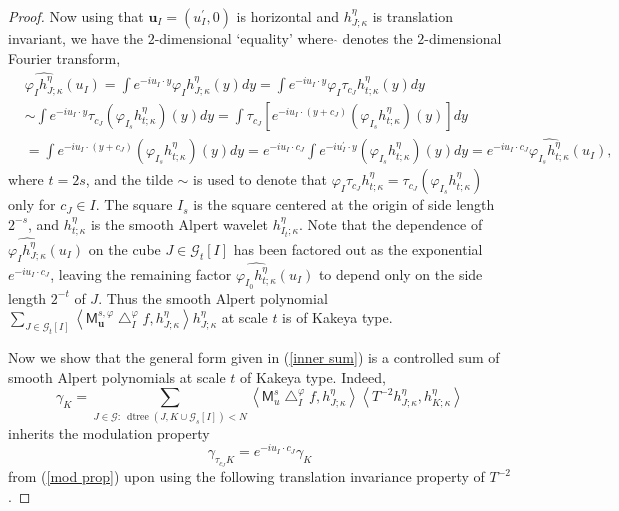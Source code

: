 \documentclass{amsart}%
\theoremstyle{plain}
\numberwithin{equation}{section}
\begin{document}
\begin{proof}
Now using that $\mathbf{u}_{I}=\left(  u_{I}^{\prime},0\right)  $ is
horizontal and $h_{J;\kappa}^{\eta}$ is translation invariant, we have the
$2$-dimensional `equality' where $\widehat{}$ denotes the $2$-dimensional
Fourier transform,%
\begin{align}
& \widehat{\varphi_{I}h_{J;\kappa}^{\eta}}\left(  u_{I}\right)  =\int
e^{-iu_{I}\cdot y}\varphi_{I}h_{J;\kappa}^{\eta}\left(  y\right)  dy=\int
e^{-iu_{I}\cdot y}\varphi_{I}\tau_{c_{J}}h_{t;\kappa}^{\eta}\left(  y\right)
dy\label{mod prop}\\
& \sim\int e^{-iu_{I}\cdot y}\tau_{c_{J}}\left(  \varphi_{I_{s}}h_{t;\kappa
}^{\eta}\right)  \left(  y\right)  dy=\int\tau_{c_{J}} \left[  e^{-iu_{I}%
\cdot\left(  y+c_{J}\right)  }\left(  \varphi_{I_{s}}h_{t;\kappa}^{\eta
}\right)  \left(  y\right)  \right]  dy\nonumber\\
& =\int e^{-iu_{I}\cdot\left(  y+c_{J}\right)  }\left(  \varphi_{I_{s}%
}h_{t;\kappa}^{\eta}\right)  \left(  y\right)  dy=e^{-iu_{I}\cdot c_{J}}\int
e^{-iu_{I}^{\prime}\cdot y}\left(  \varphi_{I_{s}}h_{t;\kappa}^{\eta}\right)
\left(  y\right)  dy=e^{-iu_{I}\cdot c_{J}}\widehat{\varphi_{I_{s}}%
h_{t;\kappa}^{\eta}}\left(  u_{I}\right)  ,\nonumber
\end{align}
where $t=2s$, and the tilde $\sim$ is used to denote that $\varphi_{I}%
\tau_{c_{J}}h_{t;\kappa}^{\eta}=\tau_{c_{J}}\left(  \varphi_{I_{s}}%
h_{t;\kappa}^{\eta}\right)  $ only for $c_{J}\in I$. The square $I_{s}$ is the
square centered at the origin of side length $2^{-s}$, and $h_{t;\kappa}%
^{\eta}$ is the smooth Alpert wavelet $h_{I_{t};\kappa}^{\eta}$. Note that the
dependence of $\widehat{\varphi_{I}h_{J;\kappa}^{\eta}}\left(  u_{I}\right)  $
on the cube $J\in\mathcal{G}_{t}\left[  I\right]  $ has been factored out as
the exponential $e^{-iu_{I}\cdot c_{J}}$, leaving the remaining factor
$\widehat{\varphi_{I_{0}}h_{t;\kappa}^{\eta}}\left(  u_{I}\right)  $ to depend
only on the side length $2^{-t}$ of $J$. Thus the smooth Alpert polynomial
$\sum_{J\in\mathcal{G}_{t}\left[  I\right]  }\left\langle \mathsf{M}%
_{\mathbf{u}}^{s,\varphi}\bigtriangleup_{I}^{\varphi}f,h_{J;\kappa}^{\eta
}\right\rangle h_{J;\kappa}^{\eta}$ at scale $t$ is of Kakeya type.

Now we show that the general form given in (\ref{inner sum}) is a controlled
sum of smooth Alpert polynomials at scale $t$ of Kakeya type. Indeed,
\[
\gamma_{K}=\sum_{J\in\mathcal{G}:\ \operatorname*{dtree}\left(  J,K\cup
\mathcal{G}_{s}\left[  I\right]  \right)  <N}\left\langle \mathsf{M}_{u}%
^{s}\bigtriangleup_{I}^{\varphi}f,h_{J;\kappa}^{\eta}\right\rangle
\left\langle T^{-2}h_{J;\kappa}^{\eta},h_{K;\kappa}^{\eta}\right\rangle
\]
inherits the modulation property
\[
\gamma_{\tau_{c_{J}}K}=e^{-iu_{I}\cdot c_{J}}\gamma_{K}%
\]
from (\ref{mod prop}) upon using the following translation invariance property
of $T^{-2}$.


\end{proof}
\end{document}
